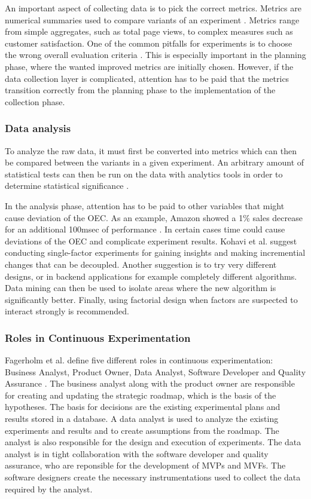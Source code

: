 \documentclass[english]{tktltiki2}
\theoremstyle{definition}
\theoremstyle{remark}
\begin{document}
An important aspect of collecting data is to pick the correct metrics. Metrics are numerical summaries used to compare variants of an experiment \cite{kohavi2009controlled}. Metrics range from simple aggregates, such as total page views, to complex measures such as customer satisfaction. One of the common pitfalls for experiments is to choose the wrong overall evaluation criteria \cite{crook2009seven}. This is especially important in the planning phase, where the wanted improved metrics are initially chosen. However, if the data collection layer is complicated, attention has to be paid that the metrics transition correctly from the planning phase to the implementation of the collection phase.  
\subsubsection{Data analysis}
To analyze the raw data, it must first be converted into metrics which can then be compared between the variants in a given experiment. An arbitrary amount of statistical tests can then be run on the data with analytics tools in order to determine statistical significance \cite{kohavi2009controlled}. 

In the analysis phase, attention has to be paid to other variables that might cause deviation of the OEC. As an example, Amazon showed a 1\% sales decrease for an additional 100msec of performance \cite{kohavi2007practical}. In certain cases time could cause deviations of the OEC and complicate experiment results. Kohavi et al. suggest conducting single-factor experiments for gaining insights and making incremential changes that can be decoupled. Another suggestion is to try very different designs, or in backend applications for example completely different algorithms. Data mining can then be used to isolate areas where the new algorithm is significantly better. Finally, using factorial design when factors are suspected to interact strongly is recommended. 


\subsubsection{Roles in Continuous Experimentation}
Fagerholm et al. define five different roles in continuous experimentation: Business Analyst, Product Owner, Data Analyst, Software Developer and Quality Assurance \cite{fagerholm2014building}. The business analyst along with the product owner are responsible for creating and updating the strategic roadmap, which is the basis of the hypotheses. The basis for decisions are the existing experimental plans and results stored in a database. A data analyst is used to analyze the existing experiments and results and to create assumptions from the roadmap. The analyst is also responsible for the design and execution of experiments. The data analyst is in tight collaboration with the software developer and quality assurance, who are reponsible for the development of MVPs and MVFs. The software designers create the necessary instrumentations used to collect the data required by the analyst.
\end{document}
